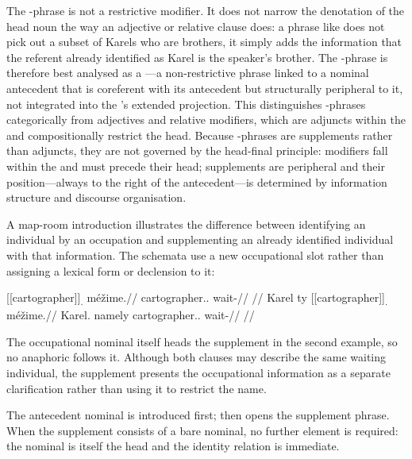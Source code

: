 The -phrase is not a restrictive modifier. It does not narrow the
denotation of the head noun the way an adjective or relative clause does: a
phrase like  does not pick out a subset of Karels who are
brothers, it simply adds the information that the referent already identified as
Karel is the speaker's brother. The -phrase is therefore best analysed
as a ---a non-restrictive phrase linked to a nominal antecedent that is
coreferent with its antecedent but structurally peripheral to it, not integrated
into the 's extended projection. This distinguishes -phrases
categorically from adjectives and relative modifiers, which are adjuncts within
the  and compositionally restrict the head. Because -phrases
are supplements rather than adjuncts, they are not governed by the head-final
principle: modifiers fall within the  and must precede their head;
supplements are peripheral and their position---always to the right of the
antecedent---is determined by information structure and discourse organisation.

A map-room introduction illustrates the difference between identifying an
individual by an occupation and supplementing an already identified
individual with that information. The schemata use a new occupational slot
rather than assigning a lexical form or declension to it:

\pex\label{ex:nm-slot-supplement}
\a
\begingl
\gla \textnormal{[[cartographer]]}\textsubscript{\Dir{}.\Sg{}} méžime.//
\glb cartographer.\Dir{}.\Sg{} wait-\Prog{}//
\glft {} //
\endgl
\a
\begingl
\gla Karel ty \textnormal{[[cartographer]]}\textsubscript{\Dir{}.\Sg{}} méžime.//
\glb Karel.\Dir{} namely cartographer.\Dir{}.\Sg{} wait-\Prog{}//
\glft {} //
\endgl
\xe

The occupational nominal itself heads the supplement in the second example,
so no anaphoric  follows it. Although both clauses may describe the
same waiting individual, the supplement presents the occupational information
as a separate clarification rather than using it to restrict the name.

The antecedent nominal is introduced first;  then opens the supplement
phrase. When the supplement consists of a bare nominal, no further element is
required: the nominal is itself the head and the identity relation is immediate.

